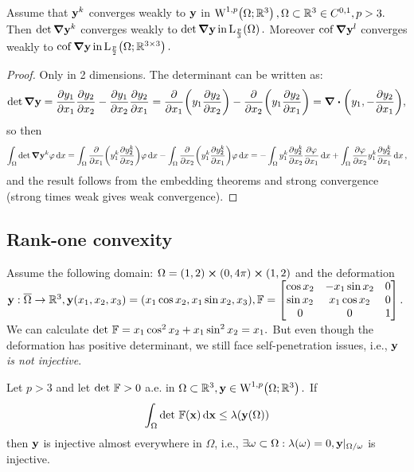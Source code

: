 \documentclass[11pt]{scrartcl} %
\begin{document}
\begin{theorem}[Magic]
	Assume that $\vb{y}^k$ converges weakly to $\vb{y}$ in $\WkpSet[1][p]{\Omega;\R^3}, \Omega \subset \R^3 \in C^{0,1}, p>3.$ Then $\det \grad \vb{y}^k$ converges weakly to $\det \grad \vb{y} \, \text{in} \, \LpSet[\frac{p}{3}]{\Omega}.$ Moreover $\operatorname{cof} \grad \vb{y}^l$ converges weakly to $\cof \grad \vb{y} \, \text{in} \, \LpSet[\frac{p}{2}]{\Omega;\R^{3 \times 3}}.$
\end{theorem}

\begin{proof}
	Only in 2 dimensions. The determinant can be written as:
	\[
		\det \grad \vb{y} = \pdv{y_1}{x_1}\pdv{y_2}{x_2}-\pdv{y_1}{x_2}\pdv{y_2}{x_1} = \pdv{x_1}\qty(y_1 \pdv{y_2}{x_2})-\pdv{x_2}\qty(y_1 \pdv{y_2}{x_1}) = \divergence{\qty(y_1,-\pdv{y_2}{x_1})},
	\]
	so then
	\[
		\int_{\Omega}\det \grad \vb{y}^k \varphi \dd{x} = \int_{\Omega}\pdv{x_1} \qty(y^k_1 \pdv{y_2^k}{x_2})\varphi\dd{x} - \int_{\Omega}\pdv{x_2}\qty(y^k_1 \pdv{y^k_2}{x_1})\varphi\dd{x} = -\int_{\Omega}y_1^k \pdv{y_2^k}{x_2}\pdv{\varphi}{x_1} \dd{x} + \int_{\Omega}\pdv{\varphi}{x_2} y_1^k \pdv{y_2^k}{x_1}\dd{x},
	\]
	and the result follows from the embedding theorems and strong convergence (strong times weak gives weak convergence).
\end{proof}

\subsection{Rank-one convexity}
\label{sec:rank-one}


	Assume the following domain: $\Omega = (1,2) \cross (0,4 \pi) \cross (1,2)$ and the deformation $\vb{y}: \overline{\Omega} \to {\mathbb R}^3, \vb{y}\qty(x_1,x_2,x_3) = \qty(x_1 \cos x_2, x_1 \sin x_2, x_3), \mathbb{F}  = \begin{bmatrix}
		\cos x_2 & -x_1 \sin x_2 & 0\\
		\sin x_2 & x_1 \cos x_2 & 0\\
		0 & 0 & 1
	\end{bmatrix}.$
	We can calculate $\det\, \mathbb{F} = x_1 \cos^{2}x_2 + x_1 \sin^{2}x_2 = x_1.$ But even though the deformation has positive determinant, we still face self-penetration issues, i.e., \textit{$\vb{y}$ is not injective}.

	\begin{theorem}
    Let $p>3$ and let $\det\, \mathbb{F} > 0$ a.e. in $\Omega \subset \R^3, \vb{y} \in \WkpSet[1][p]{\Omega; \R^3}.$ If
    \[
	    \int_{\Omega}\det\, \mathbb{F}\qty(\vb{x})\dd{\vb{x}} \leq \lambda\qty(\vb{y}\qty(\Omega))
    \]
    then $\vb{y}$ is injective almost everywhere in $\Omega$, i.e., $\exists \omega \subset \Omega: \lambda\qty(\omega) = 0, \vb{y}|_{\Omega / \omega}$ is injective.
\end{theorem}
\end{document}
